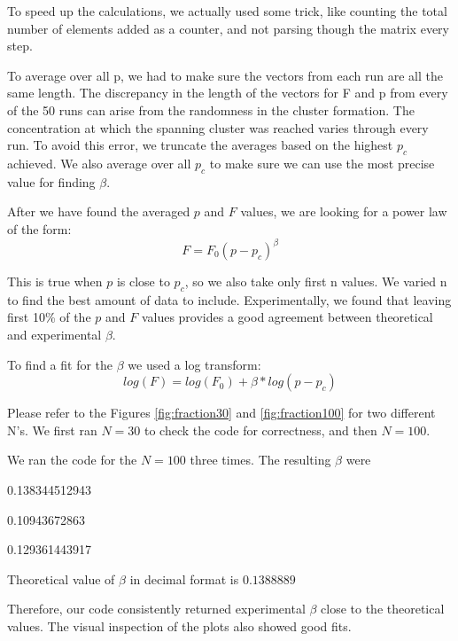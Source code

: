 \documentclass[12pt]{article}
\begin{document}
To speed up the calculations, we actually used some trick, like counting the total number of elements added as a counter, and not parsing though the matrix every step.

To average over all p, we had to make sure the vectors from each run are all the same length. The discrepancy in the length of the vectors for F and p from every of the 50 runs can arise from the randomness in the cluster formation. The concentration at which the spanning cluster was reached varies through every run. To avoid this error, we truncate the averages based on the highest $p_c$ achieved. We also average over all $p_c$ to make sure we can use the most precise value for finding $\beta$. 

After we have found the averaged $p$ and $F$ values, we are looking for a power law of the form:
\begin{equation}
    F=F_0(p-p_c)^\beta
\end{equation}

This is true when $p$ is close to $p_c$, so we also take only first n values. We varied n to find the best amount of data to include. Experimentally, we found that leaving first 10\% of the $p$ and $F$ values provides a good agreement between theoretical and experimental $\beta$.

To find a fit for the $\beta$ we used a log transform:
\begin{equation}
    log(F)=log(F_0)+\beta*log(p-p_c)
\end{equation}

Please refer to the Figures \ref{fig:fraction30} and \ref{fig:fraction100} for two different N's. We first ran $N=30$ to check the code for correctness, and then $N=100$.

We ran the code for the $N=100$ three times. The resulting $\beta$ were
\item 0.138344512943 
\item 0.10943672863 
\item 0.129361443917 

Theoretical value of $\beta$ in decimal format is $0.1388889$

Therefore, our code consistently returned experimental $\beta$ close to the theoretical values. The visual inspection of the plots also showed good fits. 
\end{document}
